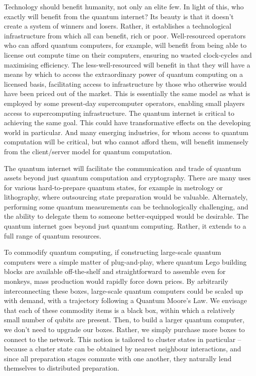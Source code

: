 \documentclass[aps,rmp,twocolumn,amsmath,amssymb,nofootinbib,superscriptaddress]{revtex4}
\begin{document}
Technology should benefit humanity, not only an elite few. In light of this, who exactly will benefit from the quantum internet? Its beauty is that it doesn't create a system of winners and losers. Rather, it establishes a technological infrastructure from which all can benefit, rich or poor. Well-resourced operators who can afford quantum computers, for example, will benefit from being able to license out compute time on their computers, ensuring no wasted clock-cycles and maximising efficiency. The less-well-resourced will benefit in that they will have a means by which to access the extraordinary power of quantum computing on a licensed basis, facilitating access to infrastructure by those who otherwise would have been priced out of the market. This is essentially the same model as what is employed by some present-day supercomputer operators, enabling small players access to supercomputing infrastructure. The quantum internet is critical to achieving the same goal. This could have transformative effects on the developing world in particular. And many emerging industries, for whom access to quantum computation will be critical, but who cannot afford them, will benefit immensely from the client/server model for quantum computation.

The quantum internet will facilitate the communication and trade of quantum assets beyond just quantum computation and cryptography. There are many uses for various hard-to-prepare quantum states, for example in metrology or lithography, where outsourcing state preparation would be valuable. Alternately, performing some quantum measurements can be technologically challenging, and the ability to delegate them to someone better-equipped would be desirable. The quantum internet goes beyond just quantum computing. Rather, it extends to a full range of quantum resources.

To commodify quantum computing, if constructing large-scale quantum computers were a simple matter of plug-and-play, where quantum Lego building blocks are available off-the-shelf and straightforward to assemble even for monkeys, mass production would rapidly force down prices. By arbitrarily interconnecting these boxes, large-scale quantum computers could be scaled up with demand, with a trajectory following a Quantum Moore's Law. We envisage that each of these commodity items is a black box, within which a relatively small number of qubits are present. Then, to build a larger quantum computer, we don't need to upgrade our boxes. Rather, we simply purchase more boxes to connect to the network. This notion is tailored to cluster states in particular -- because a cluster state can be obtained by nearest neighbour interactions, and since all preparation stages commute with one another, they naturally lend themselves to distributed preparation.
\end{document}
